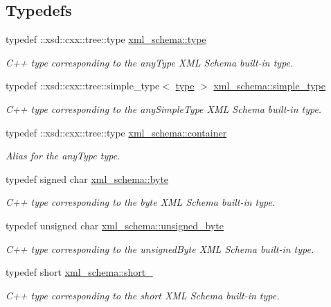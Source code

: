 \subsection*{Typedefs}
\begin{DoxyCompactItemize}
\item 
typedef \+::xsd\+::cxx\+::tree\+::type \hyperlink{namespacexml__schema_a3d277dc807f2e4ec4261dcef5c04a836}{xml\+\_\+schema\+::type}
\begin{DoxyCompactList}\small\item\em C++ type corresponding to the any\+Type X\+M\+L Schema built-\/in type. \end{DoxyCompactList}\item 
typedef \+::xsd\+::cxx\+::tree\+::simple\+\_\+type$<$ \hyperlink{classtype}{type} $>$ \hyperlink{namespacexml__schema_a44789bb4367951bcf8ae867cb983324d}{xml\+\_\+schema\+::simple\+\_\+type}
\begin{DoxyCompactList}\small\item\em C++ type corresponding to the any\+Simple\+Type X\+M\+L Schema built-\/in type. \end{DoxyCompactList}\item 
typedef \+::xsd\+::cxx\+::tree\+::type \hyperlink{namespacexml__schema_a395f5179c5fc4643909d66e9ff28d8ca}{xml\+\_\+schema\+::container}
\begin{DoxyCompactList}\small\item\em Alias for the any\+Type type. \end{DoxyCompactList}\item 
typedef signed char \hyperlink{namespacexml__schema_a2a462724b41fb68016d13b34f9a84b7d}{xml\+\_\+schema\+::byte}
\begin{DoxyCompactList}\small\item\em C++ type corresponding to the byte X\+M\+L Schema built-\/in type. \end{DoxyCompactList}\item 
typedef unsigned char \hyperlink{namespacexml__schema_a876b68656d976c6343512f3d44fe8ca2}{xml\+\_\+schema\+::unsigned\+\_\+byte}
\begin{DoxyCompactList}\small\item\em C++ type corresponding to the unsigned\+Byte X\+M\+L Schema built-\/in type. \end{DoxyCompactList}\item 
typedef short \hyperlink{namespacexml__schema_a705720c1fed1575ccdcfd21cb7ab39ab}{xml\+\_\+schema\+::short\+\_\+}
\begin{DoxyCompactList}\small\item\em C++ type corresponding to the short X\+M\+L Schema built-\/in type. \end{DoxyCompactList}\item 

\end{DoxyCompactItemize}
